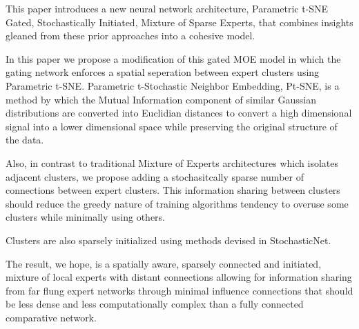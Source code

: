 \documentclass{llncs}
\begin{document}
This paper introduces a new neural network architecture, Parametric t-SNE Gated, Stochastically Initiated, Mixture of Sparse Experts, that combines insights gleaned from these prior approaches into a cohesive model.

In this paper we propose a modification of this gated MOE model in which the gating network enforces a spatial seperation between expert clusters using Parametric t-SNE. Parametric t-Stochastic Neighbor Embedding, Pt-SNE, is a method by which the Mutual Information component of similar Gaussian distributions are converted into Euclidian distances to convert a high dimensional signal into a lower dimensional space while preserving the original structure of the data.

Also, in contrast to traditional Mixture of Experts architectures which isolates adjacent clusters, we propose adding a stochasitcally sparse number of connections between expert clusters. This information sharing between clusters should reduce the greedy nature of training algorithms tendency to overuse some clusters while minimally using others.

Clusters are also sparsely initialized using methods devised in StochasticNet.

The result, we hope, is a spatially aware, sparsely connected and initiated, mixture of local experts with distant connections allowing for information sharing from far flung expert networks through minimal influence connections that should be less dense and less computationally complex than a fully connected comparative network.~\cite{Caswell:2016aa,Krizhevsky:2011aa,Sporns:2004aa,Kiyono:2019aa,Hassibi:1993aa,LeCun:1990aa,Zorins:2015aa,Samsonovich:2005aa,Morris:2003aa,Watts:1998aa,Han:2015aa,Huang:2017aa,Srivastava:2014aa,Zhigulin:2004aa,Hinton:2012aa,Mocanu:2018aa,Wan:2013aa,Shazeer:2017aa,Jacobs_1991,Cayco-Gajic:2017aa,SPORNS_2004,DBLP:journals/corr/FernandoBBZHRPW17,NIPS2015_5784,Bassett:2006aa,cite-key}

%
%
 
 

\end{document}
